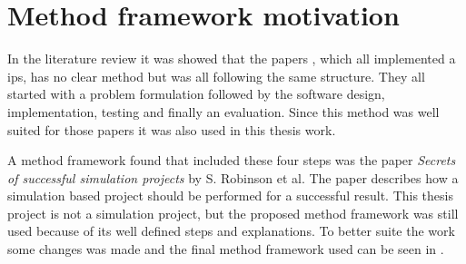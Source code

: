 \section{Method framework motivation}\label{sec:methodFramework}

In the literature review it was showed that the papers \cite{BluetoothLowEnergy2018, DevelopmentSmartphoneBasedUniversity2021, PracticalFingerprintingLocalization2017}, which all implemented a \acrfull{ips}, has no clear method but was all following the same structure.
They all started with a problem formulation followed by the software design, implementation, testing and finally an evaluation.
Since this method was well suited for those papers it was also used in this thesis work.

\bigskip

A method framework found that included these four steps was the paper \textit{Secrets of successful simulation projects} \cite{SecretsSuccessfulSimulation1995} by S. Robinson et al.
The paper describes how a simulation based project should be performed for a successful result.
This thesis project is not a simulation project, but the proposed method framework  was still used because of its well defined steps and explanations.
To better suite the work some changes was made and the final method framework used can be seen in .



